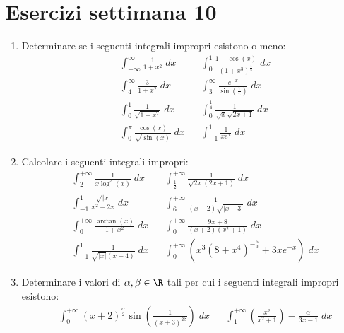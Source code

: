 \section{Esercizi settimana 10}
\begin{enumerate}
	\item Determinare se i seguenti integrali impropri esistono o meno:
	      \begin{align*}
		       & \int_{-\infty }^{\infty } \frac{1}{1 + x^2 } \; dx                           &  & \int_{0}^{1}  \frac{1 + \cos \left(x\right)}{\left(1 + x^3 \right)^{\frac{1}{4}}} \; dx \\
		       & \int_{4}^{\infty } \frac{3}{1+ x^2 } \; dx                                   &  & \int_{3}^{\infty } \frac{e^{-x}}{\sin \left(\frac{1}{x}\right)} \; dx                   \\
		       & \int_{0}^{1} \frac{1}{\sqrt{1 -x^2 }} \; dx                                  &  & \int_{0}^{\frac{1}{4}} \frac{1}{\sqrt{x} \sqrt{2x +1}} \; dx                            \\
		       & \int_{0}^{\pi } \frac{\cos \left(x\right)}{\sqrt{\sin \left(x\right)}} \; dx &  & \int_{-1}^{1} \frac{1}{xe^{x}} \; dx
	      \end{align*}
	\item Calcolare i seguenti integrali impropri:
	      \begin{align*}
		       & \int_{2}^{+\infty } \frac{1}{x \log ^3  \left(x\right)} \; dx        &  & \int_{\frac{1}{2}}^{+\infty } \frac{1}{\sqrt{2x }\left(2x +1\right)} \; dx                       \\
		       & \int_{-1}^{1} \frac{\sqrt{\left|x\right|}}{x^2  - 2x} \; dx          &  & \int_{6}^{+ \infty } \frac{1}{\left(x-2\right)\sqrt{\left|x-3\right|}} \; dx                     \\
		       & \int_{0}^{+\infty } \frac{\arctan\left(x\right)}{1 + x^2 } \; dx     &  & \int_{0}^{+ \infty } \frac{9x + 8}{\left(x+2\right) \left(x^2  + 1\right)} \; dx                 \\
		       & \int_{-1}^{1} \frac{1}{\sqrt{\left|x\right|} \left(x-4\right)} \; dx &  & \int_{0}^{+\infty } \left(x^3  \left(8 + x^{4}\right)^{-\frac{5}{3}} + 3x e ^{ - x}\right) \; dx
	      \end{align*}
	\item Determinare i valori di $ \alpha, \beta \in  \R  $ tali per cui i seguenti integrali impropri esistono:
	      \begin{align*}
		       & \int_{0}^{+ \infty } \left(x + 2\right)^{ \frac{\alpha}{2}} \sin \left(\frac{1}{\left(x+3\right)^{2 \beta }}\right) \; dx                         &  & \int_{1}^{+\infty } \left(\frac{x^2 }{x^2  +1}\right) - \frac{\alpha }{3x -1} \; dx        \\

\end{align*}
\end{enumerate}

